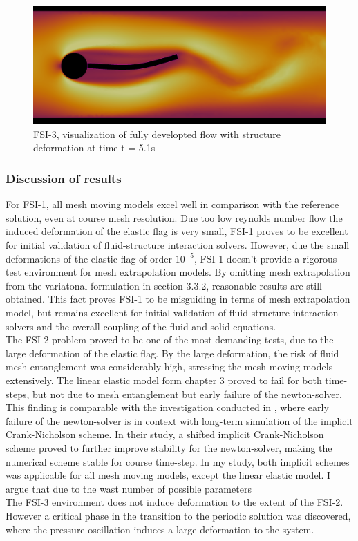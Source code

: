 \begin{figure}[h!]
  \centering
    \includegraphics[scale=0.2]{./Fig/fsi3flow.png}
      \caption{FSI-3, visualization of fully developted flow with structure deformation at time t = 5.1s}
\end{figure}

\newpage
\subsubsection*{Discussion of results}
For FSI-1, all mesh moving models excel well in comparison with the reference solution, even at course mesh resolution. Due too low reynolds number flow the induced deformation of the elastic flag is very small, FSI-1 proves to be  excellent for initial validation of fluid-structure interaction solvers. However, due the small deformations of the elastic flag of order $10^{-5}$,  FSI-1 doesn't provide a rigorous test environment for mesh extrapolation models.  By omitting mesh extrapolation from the variatonal formulation in section 3.3.2,  reasonable results are still obtained. This fact proves FSI-1 to be misguiding in terms of  mesh extrapolation model, but remains excellent for initial validation of fluid-structure interaction solvers and the overall coupling of the fluid and solid equations. \\

The FSI-2 problem proved to be one of the most demanding tests, due to the large deformation of the elastic flag. By the large deformation, the risk of fluid mesh entanglement was considerably high, stressing the mesh moving models extensively. The linear elastic model form chapter 3 proved to fail for both time-steps, but not due to mesh entanglement but early failure of the newton-solver. This finding is comparable with the investigation conducted in \cite{Richter2015}, where early failure of the newton-solver is in context with long-term simulation of the implicit Crank-Nicholson scheme. In their study, a shifted implicit Crank-Nicholson scheme proved to further improve stability for the newton-solver, making the numerical scheme stable for course time-step. In my study, both implicit schemes was applicable for all mesh moving models, except the linear elastic model. I argue that due to the wast number of possible parameters 
\\

The FSI-3 environment does not induce deformation to the extent of the FSI-2. However a critical phase in the transition to the periodic solution was discovered, where the pressure oscillation induces a large deformation to the system.










 

